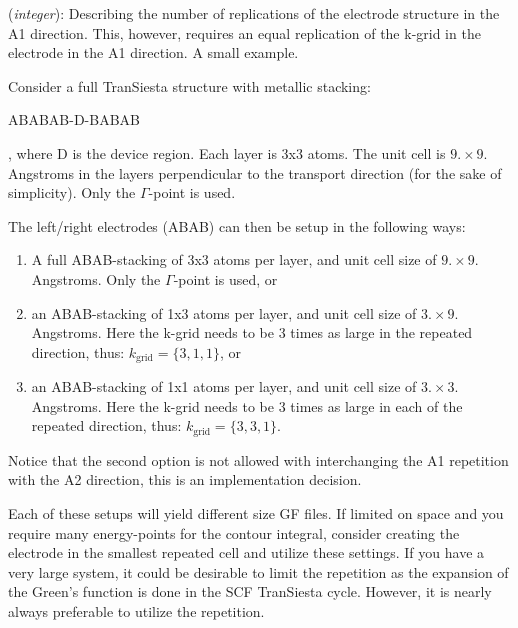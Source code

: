 \documentclass[11pt]{article}
\begin{document}
\begin{description}
  \itemsep 10pt
  \parsep 0pt
  
  \item[{\bf TS.ReplicateA1Left}] ({\it integer}):
   Describing the
  number of replications of the electrode structure in the A1 direction.
  This, however, requires an equal replication of the k-grid in the 
  electrode in the A1 direction. A small example.

  Consider a full {\sc TranSiesta} structure with metallic stacking:
  \begin{center}
    ABABAB-D-BABAB
  \end{center}
  , where D is the device region. Each layer is 3x3 atoms. The unit
  cell is $9. \times 9.$ Angstroms in the layers perpendicular to the
  transport direction (for the sake of simplicity). Only the
  $\Gamma$-point is used. 

  The left/right electrodes (ABAB) can then be setup in the following 
  ways:
  \begin{enumerate}
    \item A full ABAB-stacking of 3x3 atoms per layer, and unit 
    cell size of $9. \times 9.$ Angstroms. Only the $\Gamma$-point
    is used, or
    \item an ABAB-stacking of 1x3 atoms per layer, and unit 
    cell size of $3. \times 9.$ Angstroms. Here the k-grid needs to 
    be 3 times as large in the repeated direction, thus:
    $k_{\mathrm{grid}}=\{3,1,1\}$, or
    \item an ABAB-stacking of 1x1 atoms per layer, and unit 
    cell size of $3. \times 3.$ Angstroms. Here the k-grid needs to 
    be 3 times as large in each of the repeated direction, thus:
    $k_{\mathrm{grid}}=\{3,3,1\}$.
  \end{enumerate}
  Notice that the second option is not allowed with interchanging the
  A1 repetition with the A2 direction, this is an implementation 
  decision.

  Each of these setups will yield different size GF files. 
  If limited on space and you require many energy-points for the
  contour integral, consider creating the electrode in the smallest
  repeated cell and utilize these settings. 
  If you have a very large system, it could be desirable
  to limit the repetition as the expansion of the Green's function 
  is done in the SCF {\sc TranSiesta} cycle. However, it is nearly 
  always preferable to utilize the repetition.


\end{description}
\end{document}
